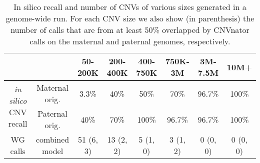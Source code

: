 \begin{table*}[t]
\centering
\begin{tabular}{c|c|c|c|c|c|c|c}
	&		&	50-200K	&	200-400K	&	400-750K	&	750K-3M	&	3M-7.5M	&	10M+ \\ \hline
\multirow{2}{*}{\emph{in silico} CNV recall}	&	Maternal orig.	&	3.3\%	&	40\%	&	50\%	&	70\%	&	96.7\%	&	100\%	\\
	&	Paternal orig.	&	40\%	&	70\%	&	100\%	&	96.7\%	&	96.7\%	&	100\%	\\ \hline
WG calls	&	combined model	&	51 (6, 3)	&	13 (2, 2)	&	5 (1, 0)	&	3 (1, 2)	&	0 (0, 0)	&	0 (0, 0)	\\
\end{tabular}
\vspace{3pt}
\caption{In silico recall and number of CNVs of various sizes generated in a genome-wide run. For each CNV size we also show (in parenthesis) the number of calls that are from at least 50\% overlapped by CNVnator \cite{abyzov2011cnvnator} calls on the maternal and paternal genomes, respectively.}
\label{tab:resWGS} 
\end{table*}
\vspace{1cm}



